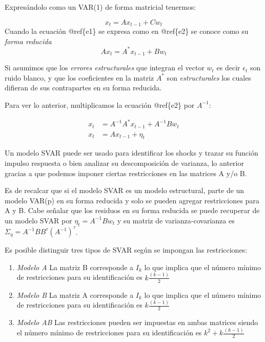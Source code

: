 \documentclass[
]{book}
\begin{document}
Expresándolo como un VAR(1) de forma matricial tenermos:

\begin{equation}
x_t = Ax_{t−1} + Cw_t
\label{e1}
\end{equation}
Cuando la ecuación @ref\{e1\} se expresa como en @ref\{e2\} se conoce como su \emph{forma reducida}
\begin{equation}
Ax_t = A^{*}x_{t−1} + Bw_t
\label{e2}
\end{equation}

Si asumimos que los \emph{errores estructurales} que integran el vector \(w_{t}\) es decir \(\epsilon_{t}\) son ruido blanco, y que los coeficientes en la matriz \(A^{*}\) son \emph{estructurales} los cuales difieran de sus contrapartes en su forma reducida.

Para ver lo anterior, multiplicamos la ecuación @ref\{e2\} por \(A^{-1}\):

\begin{align}
x_t &= A^{-1}A^{*}x_{t−1} + A^{-1}Bw_t\\
x_t &= Ax_{t−1} + \eta_t
\end{align}

Un modelo SVAR puede ser usado para identificar los shocks y trazar su función impulso respuesta o bien analizar su descomposición de varianza, lo anterior gracias a que podemos imponer ciertas restricciones en las matrices A y/o B.

Es de recalcar que si el modelo SVAR es un modelo estructural, parte de un modelo VAR(p) en su forma reducida y solo se pueden agregar restricciones para A y B. Cabe señalar que los residuos en su forma reducida se puede recuperar de un modelo SVAR por \(\eta_t=A^{-1}Bw_t\) y su matriz de varianza-covarianza es \(\Sigma_\eta=A^{-1}BB^{\tau}(A^{-1})^{\tau}\).

Es posible distinguir tres tipos de SVAR según se impongan las restricciones:

\begin{enumerate}
\def\labelenumi{\arabic{enumi}.}
\item
  \emph{Modelo A} La matriz B corresponde a \(I_{k}\) lo que implica que el número mínimo de restricciones para su identificación es \(k\frac{(k-1)}{2}\)
\item
  \emph{Modelo B} La matriz A corresponde a \(I_{k}\) lo que implica que el número mínimo de restricciones para su identificación es \(k\frac{(k-1)}{2}\)
\item
  \emph{Modelo AB} Las restricciones pueden ser impuestas en ambas matrices siendo el número mínimo de restricciones para su identificación es \(k^{2}+k\frac{(k-1)}{2}\)
\end{enumerate}
\end{document}

